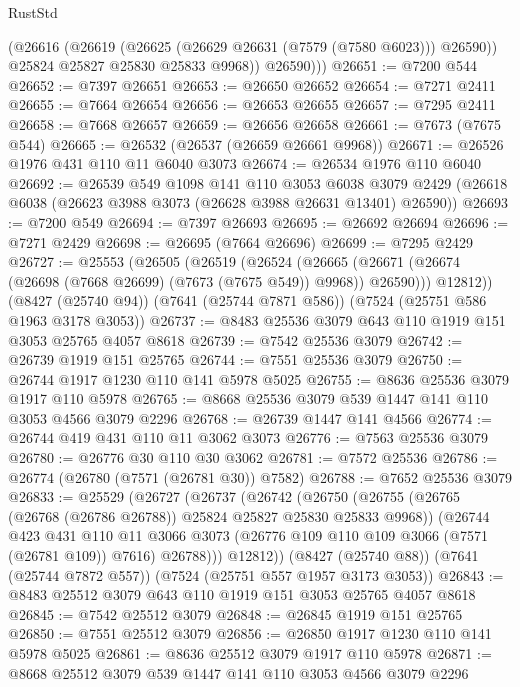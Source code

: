 \begin{lexlean}{RustStd}
\begin{coremodule}
            (@26616
              (@26619 (@26625 (@26629 @26631 (@7579 (@7580 @6023))) @26590))
              @25824
              @25827
              @25830
              @25833
              @9968))
          @26590)))
@26651 := @7200 @544
@26652 := @7397 @26651
@26653 := @26650 @26652
@26654 := @7271 @2411
@26655 := @7664 @26654
@26656 := @26653 @26655
@26657 := @7295 @2411
@26658 := @7668 @26657
@26659 := @26656 @26658
@26661 := @7673 (@7675 @544)
@26665 := @26532 (@26537 (@26659 @26661 @9968))
@26671 := @26526 @1976 @431 @110 @11 @6040 @3073
@26674 := @26534 @1976 @110 @6040
@26692 := @26539
    @549
    @1098
    @141
    @110
    @3053
    @6038
    @3079
    @2429
    (@26618 @6038 (@26623 @3988 @3073 (@26628 @3988 @26631 @13401) @26590))
@26693 := @7200 @549
@26694 := @7397 @26693
@26695 := @26692 @26694
@26696 := @7271 @2429
@26698 := @26695 (@7664 @26696)
@26699 := @7295 @2429
@26727 := @25553
    (@26505
      (@26519
        (@26524
          (@26665 (@26671 (@26674 (@26698 (@7668 @26699) (@7673 (@7675 @549)) @9968)) @26590)))
        @12812))
    (@8427 (@25740 @94))
    (@7641 (@25744 @7871 @586))
    (@7524 (@25751 @586 @1963 @3178 @3053))
@26737 := @8483 @25536 @3079 @643 @110 @1919 @151 @3053 @25765 @4057 @8618
@26739 := @7542 @25536 @3079
@26742 := @26739 @1919 @151 @25765
@26744 := @7551 @25536 @3079
@26750 := @26744 @1917 @1230 @110 @141 @5978 @5025
@26755 := @8636 @25536 @3079 @1917 @110 @5978
@26765 := @8668 @25536 @3079 @539 @1447 @141 @110 @3053 @4566 @3079 @2296
@26768 := @26739 @1447 @141 @4566
@26774 := @26744 @419 @431 @110 @11 @3062 @3073
@26776 := @7563 @25536 @3079
@26780 := @26776 @30 @110 @30 @3062
@26781 := @7572 @25536
@26786 := @26774 (@26780 (@7571 (@26781 @30)) @7582)
@26788 := @7652 @25536 @3079
@26833 := @25529
    (@26727
      (@26737
        (@26742
          (@26750
            (@26755 (@26765 (@26768 (@26786 @26788)) @25824 @25827 @25830 @25833 @9968))
            (@26744
              @423
              @431
              @110
              @11
              @3066
              @3073
              (@26776 @109 @110 @109 @3066 (@7571 (@26781 @109)) @7616)
              @26788)))
        @12812))
    (@8427 (@25740 @88))
    (@7641 (@25744 @7872 @557))
    (@7524 (@25751 @557 @1957 @3173 @3053))
@26843 := @8483 @25512 @3079 @643 @110 @1919 @151 @3053 @25765 @4057 @8618
@26845 := @7542 @25512 @3079
@26848 := @26845 @1919 @151 @25765
@26850 := @7551 @25512 @3079
@26856 := @26850 @1917 @1230 @110 @141 @5978 @5025
@26861 := @8636 @25512 @3079 @1917 @110 @5978
@26871 := @8668 @25512 @3079 @539 @1447 @141 @110 @3053 @4566 @3079 @2296

\end{coremodule}
\end{lexlean}
